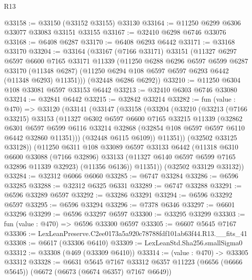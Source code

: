 \begin{lexlean}{R13}
\begin{coremodule}
@33158 := @33150 (@33152 @33155) @33130
@33164 := @11250 @6299 @6306 @33077 @33083 @33151 @33155
@33167 := @32410 @6298 @6746 @33076
@33168 := @6408 @6287
@33170 := @6408 @6293 @6442
@33171 := @33168 @33170
@33204 := @33164
    (@33167
      (@7166 @33171)
      @33151
      (@11327
        @6297
        @6597
        @6600
        @7165
        @33171
        @11339
        (@11250
          @6288
          @6296
          @6597
          @6599
          @6287
          @33170
          (@11348 @6287)
          (@11250 @6294 @108 @6597 @6597 @6293 @6442 (@11348 @6293) @11351)))
      (@32448 @6286 @6292))
@33210 := @11250 @6304 @108 @33081 @6597 @33153 @6442
@33213 := @32410 @6303 @6746 @33080
@33214 := @32841 @6442
@33215 := @32842 @33214
@33282 := fun (value : @470) =>
  @33120
    (@33141
      (@33147
        (@33158
          (@33204
            (@33210
              (@33213
                (@7166 @33215)
                @33153
                (@11327
                  @6302
                  @6597
                  @6600
                  @7165
                  @33215
                  @11339
                  (@32862
                    @6301
                    @6597
                    @6599
                    @6116
                    @33214
                    @32868
                    (@32854 @108 @6597 @6597 @6110 @6442 @32860 @11351)))
                (@32448 @6115 @6109))
              @11351))
          (@32502 @33125 @33128))
        (@11250
          @6311
          @108
          @33089
          @6597
          @33133
          @6442
          (@11318
            @6310
            @6600
            @33088
            (@7166 @32896)
            @33133
            (@11327 @6140 @6597 @6599 @7165 @32896 @11339 @32923)
            (@11356 @6136))
          @11351))
      (@32502 @33129 @33132))
@33284 := @32312 @6066 @6060
@33285 := @6747 @33284
@33286 := @6596 @33285
@33288 := @32312 @6325 @6331
@33289 := @6747 @33288
@33291 := @6596 @33289 @6597
@33292 := @33286 @33291
@33294 := @6596 @33292 @6597
@33295 := @6596 @33294
@33296 := @7378 @6346
@33297 := @6601 @33296
@33299 := @6596 @33297 @6597
@33300 := @33295 @33299
@33303 := fun (value : @470) => @6596 @33300 @6597
@33305 := @6607 @5645 @7167
@33306 := LexLeanPreserve.C2ee0173a5a920c78788fdf101ab63f44.R13.__fits_41
@33308 := @6617 (@33306 @6410)
@33309 := LexLeanStd.Sha256.smallSigma0
@33312 := @33308 (@469 (@33309 @6410))
@33314 := (value : @470) -> @33305 @33312
@33328 := @6631
    @5645
    @7167
    @33312
    @6357
    @11223
    (@6656 (@6666 @5645))
    (@6672 (@6673 (@6674 @6357) @7167 @6649))

\end{coremodule}
\end{lexlean}
